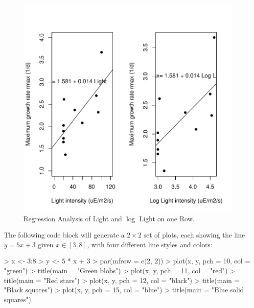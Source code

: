 \documentclass[11pt, oneside, reqno]{article}
\begin{document}
\begin{figure}
\begin{center}
\includegraphics{exercises-LightOneRow}
\end{center}
\caption{Regression Analysis of Light and $\log$ Light on one Row.}
\label{fig:LightOneRow}
\end{figure}

\eans

The following code block will generate a $2\times 2$ set of plots, each showing the line $y=5x+3$ given $x\in [3,8]$, with four different line styles and colors:

\begin{Schunk}
\begin{Sinput}
> x <- 3:8
> y <- 5 * x + 3
> par(mfrow = c(2, 2))
> plot(x, y, pch = 10, col = "green")
> title(main = "Green blobs")
> plot(x, y, pch = 11, col = "red")
> title(main = "Red stars")
> plot(x, y, pch = 12, col = "black")
> title(main = "Black squares")
> plot(x, y, pch = 15, col = "blue")
> title(main = "Blue solid squares")
\end{Sinput}
\end{Schunk}
\end{document}
